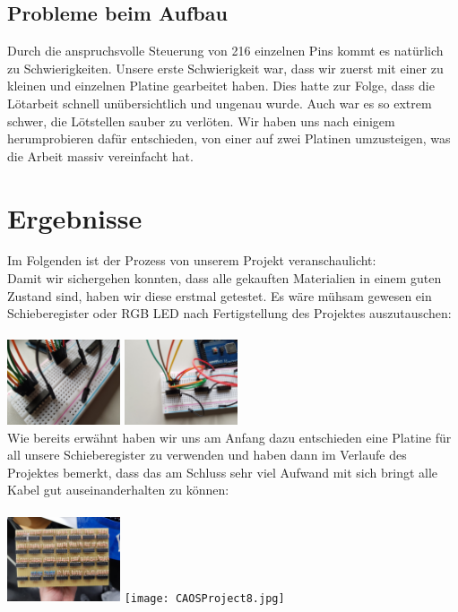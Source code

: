 \documentclass[12pt,a4paper]{article}
\begin{document}
\subsection{Probleme beim Aufbau}

Durch die anspruchsvolle Steuerung von 216 einzelnen Pins kommt es natürlich zu Schwierigkeiten. Unsere erste Schwierigkeit war, dass wir  zuerst mit einer zu kleinen und einzelnen Platine gearbeitet haben. Dies hatte zur Folge, dass die Lötarbeit schnell unübersichtlich und ungenau wurde. Auch war es so extrem schwer, die Lötstellen sauber zu verlöten. Wir haben uns nach einigem herumprobieren dafür entschieden, von einer auf zwei Platinen umzusteigen, was die Arbeit massiv vereinfacht hat.

\newpage
\section{Ergebnisse}

Im Folgenden ist der Prozess von unserem Projekt veranschaulicht: \\

Damit wir sichergehen konnten, dass alle gekauften Materialien in einem guten Zustand sind, haben wir diese erstmal 
getestet. Es wäre mühsam gewesen ein Schieberegister oder RGB LED nach Fertigstellung des Projektes auszutauschen: \\\\
\includegraphics[width=0.25\textwidth]{CAOSProject3.jpg}
\includegraphics[width=0.25\textwidth]{CAOSProject5.jpg} \\

Wie bereits erwähnt haben wir uns am Anfang dazu entschieden eine Platine für all unsere Schieberegister zu verwenden 
und haben dann im Verlaufe des Projektes bemerkt, dass das am Schluss sehr viel Aufwand mit sich bringt alle Kabel gut
auseinanderhalten zu können: \\\\
\includegraphics[width=0.25\textwidth]{CAOSProject7.jpg}
\texttt{[image: CAOSProject8.jpg]} \\\\
\end{document}
